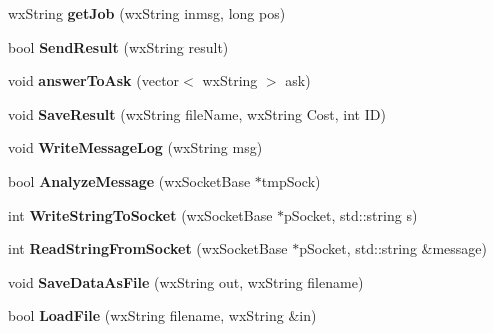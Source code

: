 \begin{DoxyCompactItemize}
\item 
\mbox{\label{class_fox_client_a0ea87749fcd62e551c473db9032738f5}} 
wx\+String {\bfseries get\+Job} (wx\+String inmsg, long pos)
\item 
\mbox{\label{class_fox_client_a5c20b1a8d1ceed132293e4159b07f5b5}} 
bool {\bfseries Send\+Result} (wx\+String result)
\item 
\mbox{\label{class_fox_client_aa3f079b8ea4841a12952a36f40337501}} 
void {\bfseries answer\+To\+Ask} (vector$<$ wx\+String $>$ ask)
\item 
\mbox{\label{class_fox_client_aabb5863f72f8bddf3883e0db8cd6b37f}} 
void {\bfseries Save\+Result} (wx\+String file\+Name, wx\+String Cost, int ID)
\item 
\mbox{\label{class_fox_client_a223edeb1154eea67889a9f65df8d51bd}} 
void {\bfseries Write\+Message\+Log} (wx\+String msg)
\item 
\mbox{\label{class_fox_client_a8c240837e1cd04994da70bf30b39c6a5}} 
bool {\bfseries Analyze\+Message} (wx\+Socket\+Base $\ast$tmp\+Sock)
\item 
\mbox{\label{class_fox_client_ada560607c76ec7620843293946ceed0f}} 
int {\bfseries Write\+String\+To\+Socket} (wx\+Socket\+Base $\ast$p\+Socket, std\+::string s)
\item 
\mbox{\label{class_fox_client_a334dae8c963088dcc0bc80c79241be76}} 
int {\bfseries Read\+String\+From\+Socket} (wx\+Socket\+Base $\ast$p\+Socket, std\+::string \&message)
\item 
\mbox{\label{class_fox_client_ad9b4e0bbcc9bb573f7f646ca36c7003e}} 
void {\bfseries Save\+Data\+As\+File} (wx\+String out, wx\+String filename)
\item 
\mbox{\label{class_fox_client_a5eac80767e41026d9877024d199ed54b}} 
bool {\bfseries Load\+File} (wx\+String filename, wx\+String \&in)
\item 

\end{DoxyCompactItemize}
